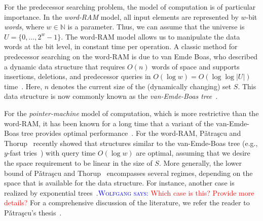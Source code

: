 \documentclass[a4paper,11pt]{article}
\newcommand{\N}{\mathbb{N}}
\newcommand{\?}{\mskip1.5mu}
\newcommand{\Patrascu}{P\v{a}tra\c{s}cu\xspace}
\newcommand{\aremark}[3]{\textcolor{blue}{\textsc{#1 #2:}}
  \textcolor{red}{\textsf{#3}}}
\newcommand{\wolfgang}[2][says]{\aremark{Wolfgang}{#1}{#2}}
\begin{document}
For the predecessor searching problem, the model 
of computation is of particular importance. In 
the \emph{word-RAM} model, all input elements 
are represented by $w$-bit \emph{words}, where 
$w \in \N$ is a parameter. Thus, we can assume 
that the universe is $U = \{0, \dots, 2^{w}-1\}$. 
The word-RAM model allows us to 
manipulate the data words at the bit level, 
in constant time per operation. A classic 
method for predecessor searching on the 
word-RAM is due to van Emde Boas, who described 
a dynamic data structure that requires $O(n)$ words
of space and supports insertions, deletions, and 
predecessor queries in 
$O(\log w) = O(\log\log |U|)$ 
time~\cite{vEmdeBoas77,vEmdeBoasKaZi76,CormenLeRiSt09}.
Here, $n$ denotes the current size of the
(dynamically changing) set $S$. This data 
structure is now commonly known as the 
\emph{van-Emde-Boas tree}~\cite{CormenLeRiSt09}.

For the \emph{pointer-machine} model of computation, 
which is more restrictive than the word-RAM, it has 
been known for a long time that a variant of the 
van-Emde-Boas tree provides optimal 
performance~\cite{MehlhornNaAl88,Mulzer09}.
For the word-RAM, \Patrascu and Thorup~\cite{PatrascuTh06,PatrascuTh07} 
recently showed that structures similar to the 
van-Emde-Boas tree (e.g., $y$-fast tries~\cite{Willard83}) 
with query time $O(\log w)$ are optimal, assuming that 
we desire the space requirement to be linear in the 
size of $S$. More generally, the lower bound of 
\Patrascu and Thorup~\cite{PatrascuTh06,PatrascuTh07} 
encompasses several regimes, depending on the 
space that is available for the data structure.
For instance, another case is realized by exponential 
trees~\cite{AnderssonTh07}.\wolfgang{Which case is this?
Provide more details?} 
For a comprehensive discussion of the literature, we refer
the reader to \Patrascu's thesis~\cite{Patrascu08}.
\end{document}
